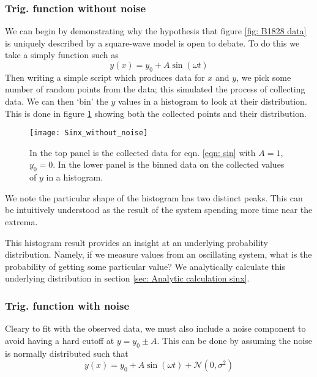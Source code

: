 \documentclass[/home/greg/Thesis/main/main.tex]{subfiles}
\begin{document}
\subsubsection{Trig. function without noise}
We can begin by demonstrating why the hypothesis that figure \ref{fig: B1828
data} is uniquely described by a square-wave model is open to debate. To do
this we take a simply function such as
\begin{equation}
    y(x) = y_{0} + A \sin(\omega t) 
    \label{eqn: sin}
\end{equation}
Then writing a simple script which produces data for $x$ and $y$, we pick some 
number of random points from the data; this simulated the process of collecting
data. We can then `bin' the $y$ values in a histogram to look at their distribution.
This is done in figure \ref{fig: Sinx without noise} showing both the collected
points and their distribution.
\begin{figure}[htb]
    \centering
    \texttt{[image: Sinx\_without\_noise]}
    \caption{In the top panel is the collected data for eqn. \eqref{eqn: sin} with
             $A=1$, $y_{0}=0$. In the lower panel is the binned data on the 
         collected values of $y$ in a histogram.}
    \label{fig: Sinx without noise}
\end{figure}
We note the particular shape of the histogram has two distinct peaks. This 
can be intuitively understood as the result of the system spending more time
near the extrema. 

This histogram result provides an insight at an underlying probability
distribution.  Namely, if we measure values from an oscillating system, what is
the probability of getting some particular value?  We analytically calculate
this underlying distribution in section \ref{sec: Analytic calculation sinx}.

\subsubsection{Trig. function with noise}

Cleary to fit with the observed data, we must also include a noise component
to avoid having a hard cutoff at $y = y_{0} \pm A$. This can be done by assuming
the noise is normally distributed such that
\begin{equation}
    y(x) = y_{0} + A \sin(\omega t) + \mathcal{N}(0, \sigma^{2})
    \label{eqn: sin + noise}
\end{equation}
\end{document}
